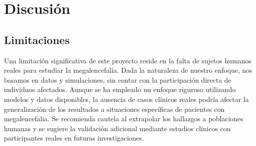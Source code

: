\section{Discusión}

\subsection{Limitaciones}
Una limitación significativa de este proyecto reside en la falta de sujetos humanos reales para estudiar la megalencefalia. Dada la naturaleza de nuestro enfoque, nos basamos en datos y simulaciones, sin contar con la participación directa de individuos afectados. Aunque se ha empleado un enfoque riguroso utilizando modelos y datos disponibles, la ausencia de casos clínicos reales podría afectar la generalización de los resultados a situaciones específicas de pacientes con megalencefalia. Se recomienda cautela al extrapolar los hallazgos a poblaciones humanas y se sugiere la validación adicional mediante estudios clínicos con participantes reales en futuras investigaciones. 
